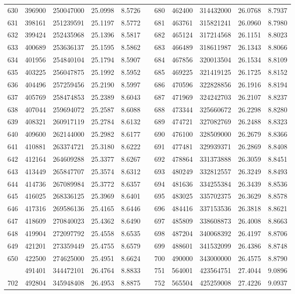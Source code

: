 \begin{longtable}{rrrrrrrrrrr}
630&396900&250047000&25.0998&8.5726&&680&462400&314432000&26.0768&8.7937\\
631&398161&251239591&25.1197&8.5772&&681&463761&315821241&26.0960&8.7980\\
632&399424&252435968&25.1396&8.5817&&682&465124&317214568&26.1151&8.8023\\
633&400689&253636137&25.1595&8.5862&&683&466489&318611987&26.1343&8.8066\\
634&401956&254840104&25.1794&8.5907&&684&467856&320013504&26.1534&8.8109\\
635&403225&256047875&25.1992&8.5952&&685&469225&321419125&26.1725&8.8152\\
636&404496&257259456&25.2190&8.5997&&686&470596&322828856&26.1916&8.8194\\
637&405769&258474853&25.2389&8.6043&&687&471969&324242703&26.2107&8.8237\\
638&407044&259694072&25.2587&8.6088&&688&473344&325660672&26.2298&8.8280\\
639&408321&260917119&25.2784&8.6132&&689&474721&327082769&26.2488&8.8323\\
640&409600&262144000&25.2982&8.6177&&690&476100&328509000&26.2679&8.8366\\
641&410881&263374721&25.3180&8.6222&&691&477481&329939371&26.2869&8.8408\\
642&412164&264609288&25.3377&8.6267&&692&478864&331373888&26.3059&8.8451\\
643&413449&265847707&25.3574&8.6312&&693&480249&332812557&26.3249&8.8493\\
644&414736&267089984&25.3772&8.6357&&694&481636&334255384&26.3439&8.8536\\
645&416025&268336125&25.3969&8.6401&&695&483025&335702375&26.3629&8.8578\\
646&417316&269586136&25.4165&8.6446&&696&484416&337153536&26.3818&8.8621\\
647&418609&270840023&25.4362&8.6490&&697&485809&338608873&26.4008&8.8663\\
648&419904&272097792&25.4558&8.6535&&698&487204&340068392&26.4197&8.8706\\
649&421201&273359449&25.4755&8.6579&&699&488601&341532099&26.4386&8.8748\\
650&422500&274625000&25.4951&8.6624&&700&490000&343000000&26.4575&8.8790\\
\newpage
701&491401&344472101&26.4764&8.8833&&751&564001&423564751&27.4044&9.0896\\
702&492804&345948408&26.4953&8.8875&&752&565504&425259008&27.4226&9.0937\\

\end{longtable}
